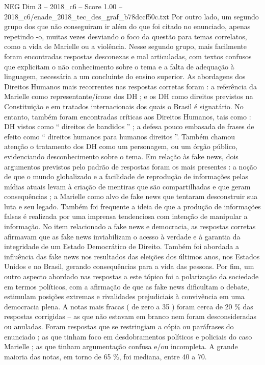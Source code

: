 \begin{textsample}{NEG Dim 3 – 2018\_c6 – Score 1.00 – 2018\_c6/enade\_2018\_tec\_des\_graf\_b78dccf50c.txt}
Por outro lado, um segundo grupo dos que não conseguiram ir além do que foi citado no enunciado, apenas repetindo -o, muitas vezes desviando o foco da questão para temas correlatos, como a vida de Marielle ou a violência.
Nesse segundo grupo, mais facilmente foram encontradas respostas desconexas e mal articuladas, com textos confusos que explicitam o não conhecimento sobre o tema e a falta de adequação à linguagem, necessária a um concluinte do ensino superior.
As abordagens dos Direitos Humanos mais recorrentes nas respostas corretas foram : a referência da Marielle como representante/ícone dos DH ; e os DH como direitos previstos na Constituição e em tratados internacionais dos quais o Brasil é signatário.
No entanto, também foram encontradas críticas aos Direitos Humanos, tais como : DH vistos como “ direitos de bandidos ” ; a defesa pouco embasada de frases de efeito como “ direitos humanos para humanos direitos ”.
Também chamou atenção o tratamento dos DH como um personagem, ou um órgão público, evidenciando desconhecimento sobre o tema.
Em relação às fake news, dois argumentos previstos pelo padrão de respostas foram os mais presentes : a noção de que o mundo globalizado e a facilidade de reprodução de informações pelas mídias atuais levam à criação de mentiras que são compartilhadas e que geram consequências ; a Marielle como alvo de fake news que tentaram desconstruir sua luta e seu legado.
Também foi frequente a ideia de que a produção de informações falsas é realizada por uma imprensa tendenciosa com intenção de manipular a informação.
No item relacionado a fake news e democracia, as respostas corretas afirmavam que as fake news inviabilizam o acesso à verdade e à garantia da integridade de um Estado Democrático de Direito.
Também foi abordada a influência das fake news nos resultados das eleições dos últimos anos, nos Estados Unidos e no Brasil, gerando consequências para a vida das pessoas.
Por fim, um outro aspecto abordado nas respostas a este tópico foi a polarização da sociedade em termos políticos, com a afirmação de que as fake news dificultam o debate, estimulam posições extremas e rivalidades prejudiciais à convivência em uma democracia plena.
A notas mais fracas ( de zero a 35 ) foram cerca de 20 \% das respostas corrigidas – as que não estavam em branco nem foram desconsideradas ou anuladas.
Foram respostas que se restringiam a cópia ou paráfrases do enunciado ; as que tinham foco em desdobramentos políticos e policiais do caso Marielle ; as que tinham argumentação confusa e/ou incompleta.
A grande maioria das notas, em torno de 65 \%, foi mediana, entre 40 a 70.

\end{textsample}

